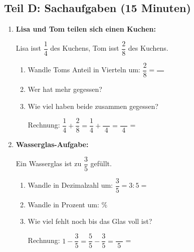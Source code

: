 \subsection*{Teil D: Sachaufgaben (15 Minuten)}

\begin{enumerate}[label=\arabic*.]
    \item \textbf{Lisa und Tom teilen sich einen Kuchen:}
    \vspace{0.5cm}

    Lisa isst $\dfrac{1}{4}$ des Kuchens, Tom isst $\dfrac{2}{8}$ des Kuchens.

    \vspace{0.5cm}
    \begin{enumerate}[label=\alph*)]
        \item Wandle Toms Anteil in Vierteln um: $\dfrac{2}{8} = \dfrac{\phantom{00}}{\phantom{00}}$
        \vspace{0.5cm}
        \item Wer hat mehr gegessen? \underline{\hspace{6cm}}
        \vspace{0.5cm}
        \item Wie viel haben beide zusammen gegessen? 

        Rechnung: $\dfrac{1}{4} + \dfrac{2}{8} = \dfrac{1}{4} + \dfrac{\phantom{00}}{4} = \dfrac{\phantom{00}}{4}$ = \underline{\hspace{3cm}}
    \end{enumerate}

    \vspace{1cm}

    \item \textbf{Wasserglas-Aufgabe:}
    \vspace{0.5cm}

    Ein Wasserglas ist zu $\dfrac{3}{5}$ gefüllt.

    \vspace{0.5cm}
    \begin{enumerate}[label=\alph*)]
        \item Wandle in Dezimalzahl um: $\dfrac{3}{5} = 3 : 5 =$ \underline{\hspace{3cm}}
        \vspace{0.5cm}
        \item Wandle in Prozent um: \underline{\hspace{3cm}} $\%$
        \vspace{0.5cm}
        \item Wie viel fehlt noch bis das Glas voll ist?

        Rechnung: $1 - \dfrac{3}{5} = \dfrac{5}{5} - \dfrac{3}{5} = \dfrac{\phantom{00}}{5}$ = \underline{\hspace{3cm}}
    \end{enumerate}
\end{enumerate}